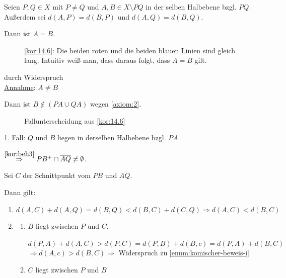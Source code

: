 \begin{bemerkung}\label{kor:14.6}%
    Seien $P, Q \in X$ mit $P \neq Q$ und $A, B \in X \setminus PQ$
    in der selben Halbebene bzgl. $PQ$. Außerdem sei $d(A,P)=d(B,P)$
    und $d(A, Q) = d(B, Q)$.

    Dann ist $A = B$.
\end{bemerkung}

\begin{figure}[htp]
    \centering
    
    \caption{\cref{kor:14.6}: Die beiden roten und die beiden blauen Linien sind gleich lang. Intuitiv weiß man, dass daraus folgt, dass $A = B$ gilt.}
    \label{fig:bild-2}
\end{figure}

\begin{beweis} durch Widerspruch\\
    \underline{Annahme}: $A \neq B$

    Dann ist $B \notin (PA \cup QA)$ wegen \ref{axiom:2}.

    \begin{figure}[ht]
        \centering
        \subfloat[1. Fall]{
            
            \label{fig:bild-3}
        }%
        \subfloat[2. Fall]{
            
            \label{fig:bild-4}
        }%
        \label{Formen}
        \caption{Fallunterscheidung aus \cref{kor:14.6}}
    \end{figure}

    \underline{1. Fall}: $Q$ und $B$ liegen in derselben Halbebene bzgl. $PA$

    $\overset{\cref{kor:beh3}}{\Rightarrow} PB^+ \cap \overline{AQ} \neq \emptyset$.

    Sei $C$ der Schnittpunkt vom $PB$ und $AQ$.

    Dann gilt:
    \begin{enumerate}[label=(\roman*)]
        \item $d(A, C) + d(A, Q) = d(B, Q) < d(B, C) + d(C, Q) \Rightarrow d(A, C) < d(B, C)$ \label{enum:komischer-beweis-i}
        \item \begin{enumerate}[label=\alph*)]
                \item $B$ liegt zwischen $P$ und $C$.

                      $d(P,A) + d(A, C) > d(P,C) = d(P,B) + d(B,c) = d(P,A) + d(B,C)$
                      $\Rightarrow d(A,c) > d(B,C) \Rightarrow$ Widerspruch zu \cref{enum:komischer-beweis-i}
                \item $C$ liegt zwischen $P$ und $B$


\end{enumerate}
\end{enumerate}
\end{beweis}
